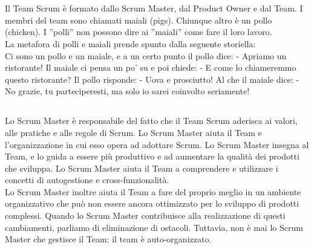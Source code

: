 \section*{\color{Blue}{I RUOLI IN SCRUM}}
\label{sec:roles}
Il Team Scrum \`e  formato dallo Scrum Master, dal Product Owner e dal Team. I membri del team sono chiamati maiali (pigs). Chiunque altro è un pollo (chicken). I ''polli'' non possono dire ai ''maiali'' come fare il loro lavoro.\\
La metafora di polli e maiali prende spunto dalla seguente storiella: \\
Ci sono un pollo e un maiale, e a un certo punto il pollo dice: - Apriamo un ristorante! Il maiale ci pensa un po' su e poi chiede: - E come lo chiameremmo questo ristorante? Il pollo risponde: - Uova e prosciutto! Al che il maiale dice: - No grazie, tu parteciperesti, ma solo io sarei coinvolto seriamente! 


\subsection*{\color{Blue}{LO SCRUM MASTER}}
\label{sec:scrummaster}
Lo Scrum Master \`e responsabile del fatto che il Team Scrum aderisca ai valori, alle pratiche e alle regole di Scrum. Lo Scrum Master aiuta il Team e l'organizzazione in cui esso opera ad adottare Scrum. Lo Scrum Master insegna al Team, e lo guida a essere pi\`u produttivo e ad aumentare la qualit\`a dei prodotti che sviluppa. Lo Scrum Master aiuta il Team a comprendere e utilizzare i concetti di autogestione e cross-funzionalit\`a.\\
Lo Scrum Master inoltre aiuta il Team a fare del proprio meglio in un ambiente organizzativo che pu\`o non essere ancora ottimizzato per lo sviluppo di prodotti complessi. Quando lo Scrum Master contribuisce alla realizzazione di questi cambiamenti, parliamo di eliminazione di ostacoli. Tuttavia, non \`e mai lo Scrum Master che gestisce il Team: il team \`e auto-organizzato.

\vspace{0.4cm}


